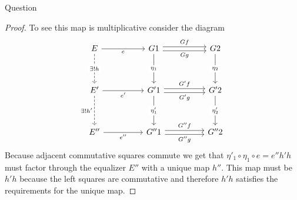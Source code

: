 \documentclass{article}
\newenvironment{question}[1][]{\begin{paragraph}{Question #1}}{\end{paragraph}}
\theoremstyle{definition}
\begin{document}
\begin{question}
\begin{proof}
        To see this map is multiplicative consider the diagram
        \[
            \begin{tikzcd}[ampersand replacement=\&]
                E \&\& G1 \&\& G2 \\
                \\
                {E'} \&\& {G'1} \&\& {G'2} \\
                \\
                {E''} \&\& {G''1} \&\& {G''2}
                \arrow["Gg"', shift right=1, from=1-3, to=1-5]
                \arrow["Gf", shift left=1, from=1-3, to=1-5]
                \arrow["{G'f}", shift left=1, from=3-3, to=3-5]
                \arrow["{G'g}"', shift right=1, from=3-3, to=3-5]
                \arrow["{\eta_{1}}"{description}, from=1-3, to=3-3]
                \arrow["{\eta_{2}}"{description}, from=1-5, to=3-5]
                \arrow["e"', from=1-1, to=1-3]
                \arrow["{e'}"', from=3-1, to=3-3]
                \arrow["{\exists!h}"{description}, dashed, from=1-1, to=3-1]
                \arrow["{\eta'_{1}}"{description}, from=3-3, to=5-3]
                \arrow["{\eta'_{2}}"{description}, from=3-5, to=5-5]
                \arrow["{G''f}", shift left=1, from=5-3, to=5-5]
                \arrow["{G''g}"', shift right=1, from=5-3, to=5-5]
                \arrow["{\exists!h'}"', dashed, from=3-1, to=5-1]
                \arrow["{e''}"', from=5-1, to=5-3]
            \end{tikzcd}
        \]
        Because adjacent commutative squares commute we get that
        \(\eta'_{1}\circ\eta_{1}\circ e=e''h'h\) must factor through the
        equalizer \(E''\) with a unique map \(h''\). This map must be \(h'h\)
        because the left squares are commutative and therefore \(h'h\) satisfies
        the requirements for the unique map.
    \end{proof}
\end{question}
\end{document}
